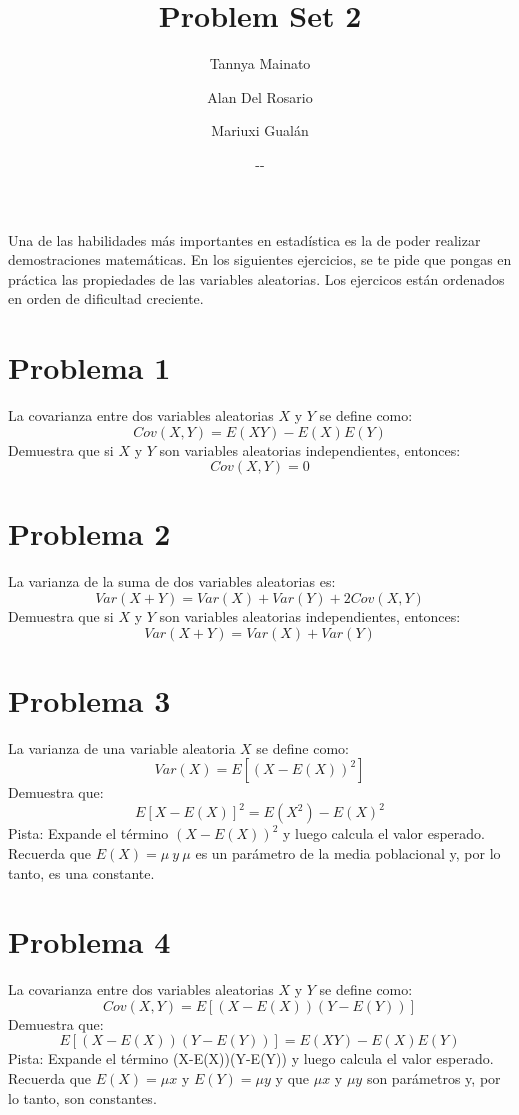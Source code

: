 \documentclass[]{article}
\title{Problem Set 2}
\author{Tannya Mainato \and Alan Del Rosario \and Mariuxi Gualán}
\date{\the\year-\twodigit\month-\twodigit\day}
\begin{document}
 
\maketitle

Una de las habilidades más importantes en estadística es la de poder realizar demostraciones matemáticas. En los siguientes ejercicios, se te pide que pongas en práctica las propiedades de las variables aleatorias. Los ejercicos están ordenados en orden de dificultad creciente. 

\section*{Problema 1}

La covarianza entre dos variables aleatorias $X$ y $Y$ se define como: 
$$Cov(X,Y)=E(XY)-E(X)E(Y)$$
Demuestra que si $X$ y $Y$ son variables aleatorias independientes, entonces: 
$$Cov(X,Y)=0$$

\section*{Problema 2}

La varianza de la suma de dos variables aleatorias es: 
$$Var(X+Y)=Var(X)+Var(Y)+2Cov(X,Y)$$
Demuestra que si $X$ y $Y$ son variables aleatorias independientes, entonces: 
$$Var(X+Y)=Var(X)+Var(Y)$$

\section*{Problema 3}

La varianza de una variable aleatoria $X$ se define como: 
$$Var(X)=E[(X-E(X))^2]$$
Demuestra que: 
$$E[X-E(X)]^2=E(X^2)-E(X)^2$$
Pista: Expande el término $(X-E(X))^2$ y luego calcula el valor esperado. Recuerda que $E(X)=\mu \ y \ \mu$ es un parámetro de la media poblacional y, por lo tanto, es una constante. 

\section*{Problema 4}

La covarianza entre dos variables aleatorias $X$ y $Y$ se define como:
$$Cov(X,Y)=E[(X-E(X))(Y-E(Y))]$$
Demuestra que: 
$$E[(X-E(X))(Y-E(Y))]=E(XY)-E(X)E(Y)$$
Pista: Expande el término (X-E(X))(Y-E(Y)) y luego calcula el valor esperado. Recuerda que $E(X)=\mu x$ y $E(Y)=\mu y$ y que $\mu x$ y $\mu y$ son parámetros y, por lo tanto, son constantes.
\end{document}
